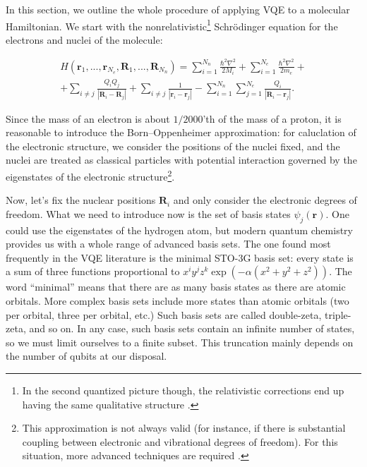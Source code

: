 In this section, we outline the whole procedure of applying VQE to a molecular Hamiltonian. We start with the nonrelativistic\footnote{In the second quantized picture though, the relativistic corrections end up having the same qualitative structure \cite{veis_relativistic_2012}.} Schr\"odinger equation for the electrons and nuclei of the molecule:

\begin{multline}
    H(\mathbf{r}_1, ..., \mathbf{r}_{N_e}, \mathbf{R}_1, ..., \mathbf{R}_{N_n}) = 
    \sum_{i=1}^{N_n} \frac{\hbar^2 \nabla^2}{2 M_i}
    + \sum_{i=1}^{N_e} \frac{\hbar^2 \nabla^2}{2 m_e} +\\
    + \sum_{i \neq j} \frac{Q_i Q_j}{|\mathbf{R}_i - \mathbf{R}_j|}
    + \sum_{i \neq j} \frac{1}{|\mathbf{r}_i - \mathbf{r}_j|}
    - \sum_{i=1}^{N_n} \sum_{j=1}^{N_e} \frac{Q_i}{|\mathbf{R}_i - \mathbf{r}_j|}.
\end{multline}

Since the mass of an electron is about $1/2000$'th of the mass of a proton, it is reasonable to introduce the Born--Oppenheimer approximation: for caluclation of the electronic structure, we consider the positions of the nuclei fixed, and the nuclei are treated as classical particles with potential interaction governed by the eigenstates of the electronic structure\footnote{This approximation is not always valid (for instance, if there is substantial coupling between electronic and vibrational degrees of freedom). For this situation, more advanced techniques are required \cite{yalouz_state-averaged_2021}.}.

Now, let's fix the nuclear positions $\mathbf{R}_i$ and only consider the electronic degrees of freedom. What we need to introduce now is the set of basis states $\psi_j(\mathbf{r})$. One could use the eigenstates of the hydrogen atom, but modern quantum chemistry provides us with a whole range of advanced basis sets. The one found most frequently in the VQE literature is the minimal STO-3G basis set: every state is a sum of three functions proportional to $x^i y^j z^k \exp(-\alpha (x^2 + y^2 + z^2))$. The word ``minimal'' means that there are as many basis states as there are atomic orbitals. More complex basis sets include more states than atomic orbitals (two per orbital, three per orbital, etc.) Such basis sets are called double-zeta, triple-zeta, and so on. In any case, such basis sets contain an infinite number of states, so we must limit ourselves to a finite subset. This truncation mainly depends on the number of qubits at our disposal.

